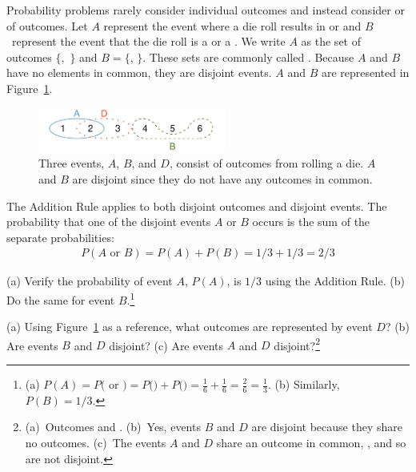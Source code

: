 

Probability problems rarely consider individual outcomes and instead consider  or  of outcomes. Let $A$ represent the event where a die roll results in  or  and $B$~represent the event that the die roll is a  or a . We write $A$ as the set of outcomes $\{$,~$\}$ and $B=\{$, $\}$. These sets are commonly called . Because $A$ and $B$ have no elements in common, they are disjoint events. $A$ and $B$ are represented in Figure~\ref{disjointSets}.

\begin{figure}[hhh]
\centering
\includegraphics[width=0.55\textwidth]{ch_probability/figures/disjointSets/disjointSets}
\caption{Three events, $A$, $B$, and $D$, consist of outcomes from rolling a die. $A$ and $B$ are disjoint since they do not have any outcomes in common.}
\label{disjointSets}
\end{figure}



The Addition Rule applies to both disjoint outcomes and disjoint events. The probability that one of the disjoint events $A$ or $B$ occurs is the sum of the separate probabilities:
\begin{align*}
P(A\text{ or }B) = P(A) + P(B) = 1/3 + 1/3 = 2/3
\end{align*}

\begin{exercise}
(a) Verify the probability of event $A$, $P(A)$, is $1/3$ using the Addition Rule. (b) Do the same for event $B$.\footnote{(a) $P(A) = P($ or $) = P($$) + P($$) = \frac{1}{6} + \frac{1}{6} = \frac{2}{6} = \frac{1}{3}$. (b) Similarly, $P(B) = 1/3$.}
\end{exercise}

\begin{exercise} \label{exerExaminingDisjointSetsABD}
(a) Using Figure~\ref{disjointSets} as a reference, what outcomes are represented by event $D$? (b) Are events $B$ and $D$ disjoint? (c) Are events $A$ and $D$ disjoint?\footnote{(a)~Outcomes  and . (b)~Yes, events $B$ and $D$ are disjoint because they share no outcomes. (c)~The events $A$ and $D$ share an outcome in common, , and so are not disjoint.}
\end{exercise}

